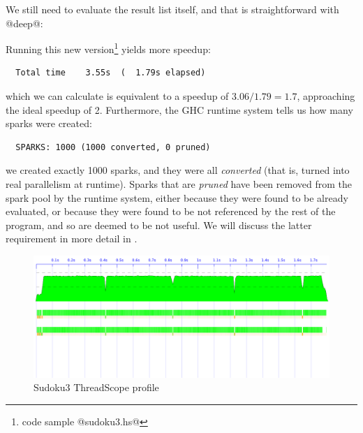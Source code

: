 We still need to evaluate the result list itself, and that is
straightforward with @deep@:


\noindent Running this new version\footnote{code sample @sudoku3.hs@}
yields more speedup:

{\small \begin{verbatim}
  Total time    3.55s  (  1.79s elapsed)
\end{verbatim}}

\noindent which we can calculate is equivalent to a speedup of
$3.06/1.79 = 1.7$, approaching the ideal speedup of 2.  Furthermore,
the GHC runtime system tells us how many sparks were created:

{\small \begin{verbatim}
  SPARKS: 1000 (1000 converted, 0 pruned)
\end{verbatim}}

\noindent we created exactly 1000 sparks, and they were all
\emph{converted} (that is, turned into real parallelism at runtime).
Sparks that are \emph{pruned} have been removed from the spark pool by
the runtime system, either because they were found to be already
evaluated, or because they were found to be not referenced by the rest
of the program, and so are deemed to be not useful.  We will discuss
the latter requirement in more detail in .

\begin{figure}
\begin{center}
\includegraphics[scale=0.34]{sudoku3.png}
\end{center}
\caption{Sudoku3 ThreadScope profile}
\label{fig:sudoku3-threadscope}
\end{figure}


